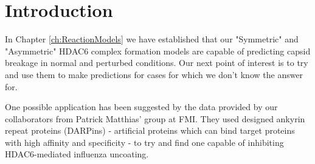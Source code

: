 \section{Introduction}


In Chapter \ref{ch:ReactionModels} we have established that our "Symmetric" and "Asymmetric" HDAC6 complex formation models are capable of predicting capsid breakage in normal and perturbed conditions. Our next point of interest is to try and use them to make predictions for cases for which we don't know the answer for.

One possible application has been suggested by the data provided by our collaborators from Patrick Matthias' group at FMI. They used designed ankyrin repeat proteins (DARPins) - artificial proteins which can bind target proteins with high affinity and specificity - to try and find one capable of inhibiting HDAC6-mediated influenza uncoating.

